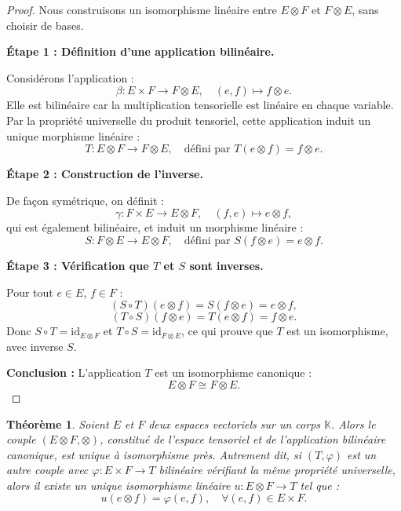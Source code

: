 \documentclass[12pt]{article}
\newtheorem{theoreme}{Théorème}
\begin{document}
	\begin{proof}
		Nous construisons un isomorphisme linéaire entre \( E \otimes F \) et \( F \otimes E \), sans choisir de bases.
		
		\textbf{Étape 1 : Définition d'une application bilinéaire.}
		
		Considérons l'application :
		\[
		\beta : E \times F \to F \otimes E, \quad (e, f) \mapsto f \otimes e.
		\]
		Elle est bilinéaire car la multiplication tensorielle est linéaire en chaque variable. Par la propriété universelle du produit tensoriel, cette application induit un unique morphisme linéaire :
		\[
		T : E \otimes F \to F \otimes E, \quad \text{défini par } T(e \otimes f) = f \otimes e.
		\]
		
		\textbf{Étape 2 : Construction de l'inverse.}
		
		De façon symétrique, on définit :
		\[
		\gamma : F \times E \to E \otimes F, \quad (f, e) \mapsto e \otimes f,
		\]
		qui est également bilinéaire, et induit un morphisme linéaire :
		\[
		S : F \otimes E \to E \otimes F, \quad \text{défini par } S(f \otimes e) = e \otimes f.
		\]
		
		\textbf{Étape 3 : Vérification que \( T \) et \( S \) sont inverses.}
		
		Pour tout \( e \in E \), \( f \in F \) :
		\[
		(S \circ T)(e \otimes f) = S(f \otimes e) = e \otimes f,
		\]
		\[
		(T \circ S)(f \otimes e) = T(e \otimes f) = f \otimes e.
		\]
		Donc \( S \circ T = \mathrm{id}_{E \otimes F} \) et \( T \circ S = \mathrm{id}_{F \otimes E} \), ce qui prouve que \( T \) est un isomorphisme, avec inverse \( S \).
		
		\textbf{Conclusion :} L'application \( T \) est un isomorphisme canonique :
		\[
		\boxed{E \otimes F \cong F \otimes E}.
		\]
	\end{proof}
	
	\newpage
	
	\begin{theoreme}
		Soient \( E \) et \( F \) deux espaces vectoriels sur un corps \( \mathbb{K} \).  
		Alors le couple \( (E \otimes F, \otimes) \), constitué de l’espace tensoriel et de l’application bilinéaire canonique, est unique à isomorphisme près.  
		Autrement dit, si \( (T, \varphi) \) est un autre couple avec \( \varphi : E \times F \to T \) bilinéaire vérifiant la même propriété universelle, alors il existe un unique isomorphisme linéaire \( u : E \otimes F \to T \) tel que :
		\[
		u(e \otimes f) = \varphi(e, f), \quad \forall (e, f) \in E \times F.
		\]
	\end{theoreme}
	
\end{document}
